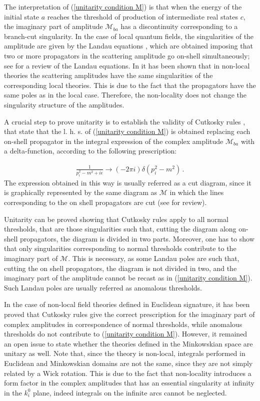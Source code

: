 \documentclass[a4paper,11pt]{article}
\newcommand{\be}{\begin{eqnarray}}
\newcommand{\ee}{\end{eqnarray}}
\begin{document}
The interpretation of (\ref{unitarity condition M}) is that when the energy of the initial state $a$ reaches the threshold of production of intermediate real states $c$, the imaginary part of amplitude $\mathcal{M}_{ba}$   has a  discontinuity corresponding to a branch-cut singularity. In the case of local quantum fields, the singularities of the amplitude are given by the Landau equations \cite{landau},  which are obtained imposing that two or more propagators in the scattering amplitude go on-shell simultaneously; see \cite{itzykson zuber} for a review of the Landau equations. In \cite{unitarity1,unitarity2,unitarity3} it has been shown that in non-local theories the scattering amplitudes have the same singularities of the corresponding local theories. This is due to the fact that the propagators have the same poles as in the local case. Therefore, the non-locality does not change  the singularity structure of the amplitudes.


A crucial step to prove unitarity is to establish the validity of Cutkosky rules \cite{cutkosky}, that state that the l. h. s. of (\ref{unitarity condition M}) is obtained replacing each on-shell propagator in the integral expression of the complex amplitude $\mathcal{M}_{ba}$ with a delta-function, according to the following prescription:


\be\label{cutkosky rule}
\frac{1}{p^2_i -m^2 + i \epsilon}\longrightarrow (-2\pi i) \delta\left(p^2_i - m^2 \right) \, .
\ee
The expression obtained in this way is usually referred as a cut diagram, since it is graphically represented by the same diagram as $\mathcal{M}$ in which the lines corresponding to the on shell propagators are cut  (see \cite{peskin,itzykson zuber,cutkosky,landau} for review). 

Unitarity can be proved showing that Cutkosky rules apply to all normal thresholds, that are those singularities such that, cutting the diagram along on-shell propagators, the diagram is divided in two parts. Moreover, one has to show that only singularities corresponding to normal thresholds contribute to the imaginary part  of $\mathcal{M}$. This is necessary, as some Landau poles  are such that,  cutting the on shell propagators, the diagram is not divided in two, and the imaginary part of the amplitude cannot be recast as in (\ref{unitarity condition M}).  Such Landau poles are usually referred as anomalous thresholds. 

In the case of non-local field theories defined in Euclidean signature, it has been proved  \cite{unitarity1,unitarity2,unitarity3} that Cutkosky rules give the correct prescription for the imaginary part of  complex amplitudes in correspondence of normal thresholds, while  anomalous thresholds do not contribute to (\ref{unitarity condition M}). However, it remained an open issue to state whether the theories defined in the Minkowskian space are unitary as well. Note that, since the theory is non-local, integrals performed in Euclidean and Minkowskian domains are not the same, since they are not simply related by a Wick rotation. This is due to the fact that non-locality introduces a form factor in the complex amplitudes that has an essential singularity at infinity in the $k^0_i$ plane, indeed integrals on the infinite arcs cannot be neglected. 
\end{document}
